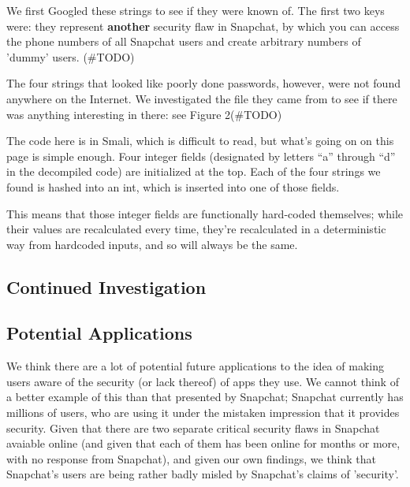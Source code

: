 \documentclass[11pt]{article}
\numberwithin{theorem}{subsection}
\begin{document}
We first Googled these strings to see if they were known of.  The first two keys were: they represent \textbf{another} security
flaw in Snapchat, by which you can access the phone numbers of all Snapchat users and create arbitrary numbers of 'dummy' users.\cite{2} (\#TODO)

The four strings that looked like poorly done passwords, however, were not found anywhere on the Internet.  We investigated the file
they came from to see if there was anything interesting in there: see Figure 2(\#TODO)

The code here is in Smali, which is difficult to read, but what's going on on this page is simple enough.  Four integer fields (designated by
letters ``a'' through ``d'' in the decompiled code) are initialized at the top.  Each of the four strings we found is hashed into an int, which 
is inserted into one of those fields.

This means that those integer fields are functionally hard-coded themselves; while their values are recalculated every time, they're recalculated in a
deterministic way from hardcoded inputs, and so will always be the same.

\subsection{Continued Investigation}

\subsection{Potential Applications}

We think there are a lot of potential future applications to the idea of making users aware of the security (or lack thereof) of apps they use.  We
cannot think of a better example of this than that presented by Snapchat; Snapchat currently has millions of users, who are using it under the
mistaken impression that it provides security.  Given that there are two separate critical security flaws in Snapchat avaiable online (and given that
each of them has been online for months or more, with no response from Snapchat), and given our own findings, we think that Snapchat's users are being
rather badly misled by Snapchat's claims of 'security'.
\end{document}
